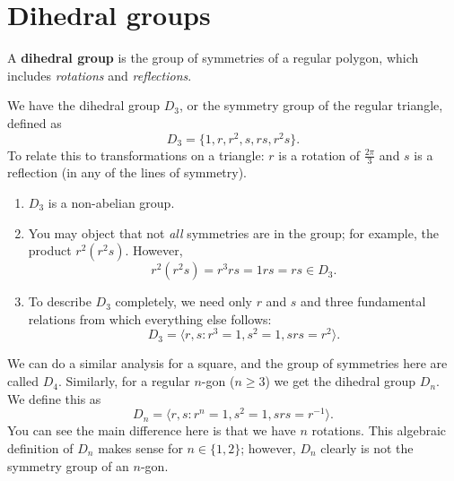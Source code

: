 \chapter{Dihedral groups}

A \textbf{dihedral group} is the group of symmetries of a regular polygon,
which includes \emph{rotations} and \emph{reflections}.

We have the dihedral group $D_3$, or the symmetry group of the regular triangle,
defined as
\[
    D_3 = \{ 1, r, r^2, s, rs, r^2s \}.
\]
To relate this to transformations on a triangle: $r$ is a rotation of
$\frac{2\pi}3$ and $s$ is a reflection (in any of the lines of symmetry).

\begin{remark}
    \begin{enumerate}
        \item 
            $D_3$ is a non-abelian group.

        \item
            You may object that not \emph{all} symmetries are in the group;
            for example, the product $r^2(r^2s)$.
            However,
            \[
                r^2(r^2s) = r^3rs = 1rs = rs \in D_3.
            \]

        \item To describe $D_3$ completely, we need only $r$ and $s$ and
            three fundamental relations from which everything else follows:
            \[
                D_3 = \langle r, s : r^3 = 1, s^2 = 1, srs = r^2 \rangle.
            \]
    \end{enumerate}
\end{remark}

We can do a similar analysis for a square,
and the group of symmetries here are called $D_4$.
Similarly, for a regular $n$-gon ($n \geq 3$)
we get the dihedral group $D_n$.
We define this as
\[
    D_n = \langle r, s: r^n = 1, s^2 = 1, srs = r^{-1} \rangle.
\]
You can see the main difference here is that we have $n$ rotations.
This algebraic definition of $D_n$ makes sense for $n \in \{1, 2\}$;
however, $D_n$ clearly is not the symmetry group of an $n$-gon.
